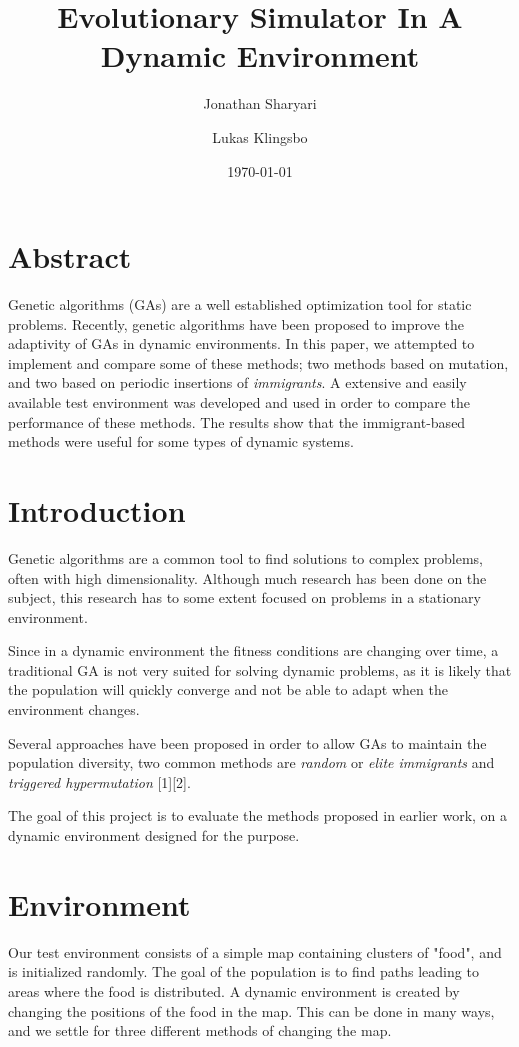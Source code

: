 \documentclass[a4paper,12pt]{article}
\title{\textbf{Evolutionary Simulator In A Dynamic Environment}}
\author{Jonathan Sharyari \and Lukas Klingsbo}  %
\date{\today}
\begin{document}
\maketitle

\section*{Abstract}
Genetic algorithms (GAs) are a well established optimization tool for static problems. Recently, genetic algorithms have been proposed to improve the adaptivity of GAs in dynamic environments. In this paper, we attempted to implement and compare some of these methods; two methods based on mutation, and two based on periodic insertions of \emph{immigrants}. A extensive and easily available test environment was developed and used in order to compare the performance of these methods. The results show that the immigrant-based methods were useful for some types of  dynamic systems.


\section{Introduction}
Genetic algorithms are a common tool to find solutions to complex problems, often with high dimensionality. Although much research has been done on the subject, this research has to some extent focused on problems in a stationary environment.

Since in a dynamic environment the fitness conditions are changing over time, a traditional GA is not very suited for solving dynamic problems, as it is likely that the population will quickly converge and not be able to adapt when the environment changes.

Several approaches have been proposed in order to allow GAs to maintain the population diversity, two common methods are \emph{random} or \emph{elite immigrants} and \emph{triggered hypermutation} [1][2].

The goal of this project is to evaluate the methods proposed in earlier work, on a dynamic environment designed for the purpose.

\section{Environment}
Our test environment consists of a simple map containing clusters of "food", and is initialized randomly. The goal of the population is to find paths leading to areas where the food is distributed. A dynamic environment is created by changing the positions of the food in the map. This can be done in many ways, and we settle for three different methods of changing the map.
\end{document}
